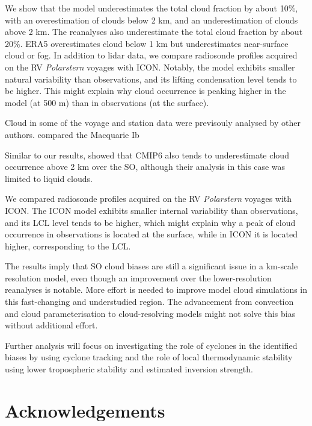\documentclass[12pt,a4paper]{article}
\begin{document}
We show that the model underestimates the total cloud fraction by about 10\%,
with an overestimation of clouds below 2 km, and an underestimation of clouds
above 2 km. The reanalyses also underestimate the total cloud fraction by about
20\%.  ERA5 overestimates cloud below 1 km but underestimates near-surface
cloud or fog. In addition to lidar data, we compare radiosonde profiles
acquired on the RV \textit{Polarstern} voyages with ICON. Notably, the model
exhibits smaller natural variability than observations, and its lifting
condensation level tends to be higher. This might explain why cloud occurrence
is peaking higher in the model (at 500 m) than in observations (at the
surface).

Cloud in some of the voyage and station data were previsouly analysed by other
authors. \cite{pei2023} compared the Macquarie Ib


Similar to our results, \cite{cesana2022} showed that CMIP6 also tends to
underestimate cloud occurrence above 2 km over the SO, although their analysis
in this case was limited to liquid clouds.

We compared radiosonde profiles acquired on the RV \emph{Polarstern} voyages
with ICON.  The ICON model exhibits smaller internal variability than
observations, and its LCL level tends to be higher, which might explain why a
peak of cloud occurrence in observations is located at the surface, while in
ICON it is located higher, corresponding to the LCL.

The results imply that SO cloud biases are still a significant issue in a
km-scale resolution model, even though an improvement over the lower-resolution
reanalyses is notable. More effort is needed to improve model cloud simulations
in this fast-changing and understudied region. The advancement from convection
and cloud parameterisation to cloud-resolving models might not solve this bias
without additional effort.

Further analysis will focus on investigating the role of cyclones in the
identified biases by using cyclone tracking and the role of local thermodynamic
stability using lower tropospheric stability and estimated inversion strength.

\fontsize{12pt}{14pt}\selectfont
\section*{Acknowledgements}
\end{document}
